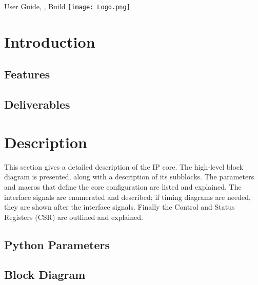 \documentclass{ug}
\date{\today}
\begin{document}
\maketitle
{}

\vspace*{\fill}
User Guide, , Build 
\hspace*{\fill} \texttt{[image: Logo.png]}

\cleardoublepage
{}
\setcounter{page}{1}

\cleardoublepage
\tableofcontents
\clearpage
\listoftables
\clearpage
\listoffigures
\cleardoublepage
{}
\setcounter{page}{1}
\section{Introduction}
\label{sec:intro}



\subsection{Features}
\label{sec:feat}


\subsection{Deliverables}
\label{sec:deliv}


\ifdefined\SECTIONCLEARPAGE
\clearpage
\fi
\section{Description}

This section gives a detailed description of the IP core. The high-level block
diagram is presented, along with a description of its subblocks. The parameters and
macros that define the core configuration are listed and explained. The
interface signals are enumerated and described; if timing diagrams are needed,
they are shown after the interface signals. Finally the Control and Status
Registers (CSR) are outlined and explained.


\ifdefined\PYPARAMS
\subsection{Python Parameters}
\label{sec:py_params}

\fi

\subsection{Block Diagram}
\label{sec:bdd}

\end{document}
